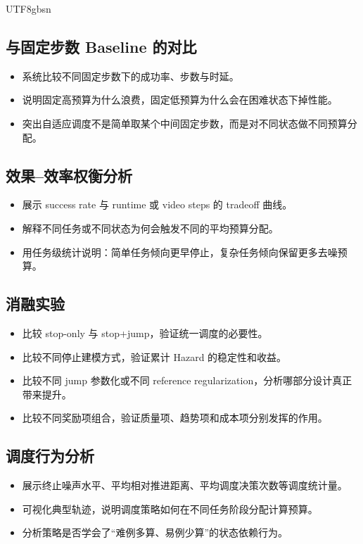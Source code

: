 \documentclass{article}
\begin{document}
\begin{CJK*}{UTF8}{gbsn}
\subsection{与固定步数 Baseline 的对比}

\begin{itemize}
  \item 系统比较不同固定步数下的成功率、步数与时延。
  \item 说明固定高预算为什么浪费，固定低预算为什么会在困难状态下掉性能。
  \item 突出自适应调度不是简单取某个中间固定步数，而是对不同状态做不同预算分配。
\end{itemize}

\subsection{效果--效率权衡分析}

\begin{itemize}
  \item 展示 success rate 与 runtime 或 video steps 的 tradeoff 曲线。
  \item 解释不同任务或不同状态为何会触发不同的平均预算分配。
  \item 用任务级统计说明：简单任务倾向更早停止，复杂任务倾向保留更多去噪预算。
\end{itemize}

\subsection{消融实验}

\begin{itemize}
  \item 比较 stop-only 与 stop+jump，验证统一调度的必要性。
  \item 比较不同停止建模方式，验证累计 Hazard 的稳定性和收益。
  \item 比较不同 jump 参数化或不同 reference regularization，分析哪部分设计真正带来提升。
  \item 比较不同奖励项组合，验证质量项、趋势项和成本项分别发挥的作用。
\end{itemize}

\subsection{调度行为分析}

\begin{itemize}
  \item 展示终止噪声水平、平均相对推进距离、平均调度决策次数等调度统计量。
  \item 可视化典型轨迹，说明调度策略如何在不同任务阶段分配计算预算。
  \item 分析策略是否学会了“难例多算、易例少算”的状态依赖行为。
\end{itemize}


\end{CJK*}
\end{document}
